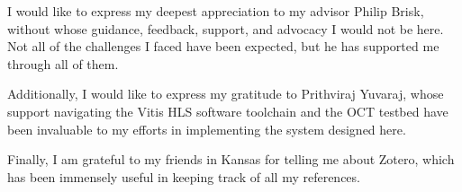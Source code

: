 I would like to express my deepest appreciation to my advisor Philip Brisk,
without whose guidance, feedback, support, and advocacy I would not be here. Not
all of the challenges I faced have been expected, but he has supported me
through all of them.

Additionally, I would like to express my gratitude to Prithviraj Yuvaraj, whose
support navigating the Vitis HLS software toolchain and the OCT testbed have
been invaluable to my efforts in implementing the system designed here.

Finally, I am grateful to my friends in Kansas for telling me about Zotero,
which has been immensely useful in keeping track of all my references.
